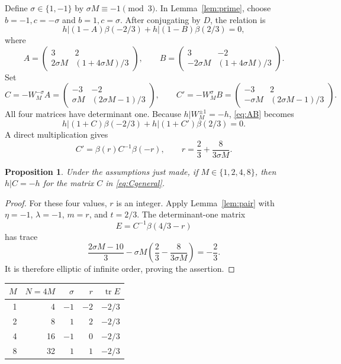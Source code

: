 \documentclass[11pt]{article}
\newtheorem{proposition}[theorem]{Proposition}
\theoremstyle{remark}
\newcommand{\bb}{\beta}
\newcommand{\tr}{\operatorname{tr}}
\begin{document}
Define $\sigma\in\{1,-1\}$ by $\sigma M\equiv-1\pmod3$.
In Lemma~\ref{lem:prime}, choose $b=-1,c=-\sigma$ and
$b=1,c=\sigma$. After conjugating by $D$, the relation is
\begin{equation}\label{eq:AB}
 h|(1-A)\bb(-2/3)+h|(1-B)\bb(2/3)=0,
\end{equation}
where
\[
 A=\begin{pmatrix}3&2\\2\sigma M&(1+4\sigma M)/3\end{pmatrix},
 \qquad
 B=\begin{pmatrix}3&-2\\-2\sigma M&(1+4\sigma M)/3\end{pmatrix}.
\]
Set
\begin{equation}\label{eq:Cgeneral}
 C=-W_M^{-\sigma}A
  =\begin{pmatrix}-3&-2\\\sigma M&(2\sigma M-1)/3\end{pmatrix},
 \qquad
 C'=-W_M^{\sigma}B
  =\begin{pmatrix}-3&2\\-\sigma M&(2\sigma M-1)/3\end{pmatrix}.
\end{equation}
All four matrices have determinant one. Because $h|W_M^{\pm1}=-h$,
\eqref{eq:AB} becomes
\begin{equation}\label{eq:CC}
 h|(1+C)\bb(-2/3)+h|(1+C')\bb(2/3)=0.
\end{equation}
A direct multiplication gives
\begin{equation}\label{eq:r}
 C'=\bb(r)C^{-1}\bb(-r),\qquad
 r=\frac23+\frac{8}{3\sigma M}.
\end{equation}

\begin{proposition}\label{prop:four}
Under the assumptions just made, if $M\in\{1,2,4,8\}$, then
$h|C=-h$ for the matrix $C$ in \eqref{eq:Cgeneral}.
\end{proposition}
\begin{proof}
For these four values, $r$ is an integer. Apply Lemma~\ref{lem:pair}
with $\eta=-1$, $\lambda=-1$, $m=r$, and $t=2/3$.
The determinant-one matrix
\[
 E=C^{-1}\bb(4/3-r)
\]
has trace
\[
 \frac{2\sigma M-10}{3}
 -\sigma M\left(\frac23-\frac{8}{3\sigma M}\right)
 =-\frac23.
\]
It is therefore elliptic of infinite order, proving the assertion.
\end{proof}

\begin{center}
\begin{tabular}{@{}rrrrr@{}}
\toprule
$M$ & $N=4M$ & $\sigma$ & $r$ & $\tr E$\\
\midrule
1 & 4  & $-1$ & $-2$ & $-2/3$\\
2 & 8  & $ 1$ & $ 2$ & $-2/3$\\
4 & 16 & $-1$ & $ 0$ & $-2/3$\\
8 & 32 & $ 1$ & $ 1$ & $-2/3$\\
\bottomrule
\end{tabular}
\end{center}
\end{document}

